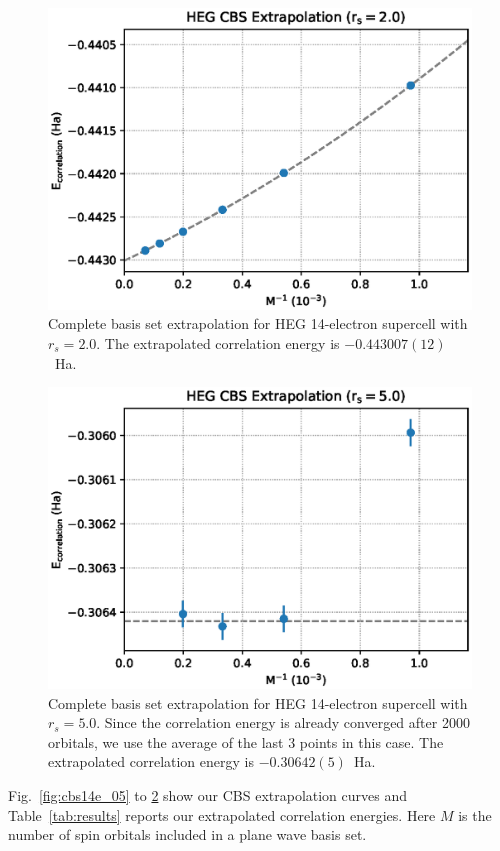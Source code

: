 \documentclass[%
reprint,
 superscriptaddress,
 amsmath,amssymb,
 aps,
]{revtex4-1}
\begin{document}
\begin{figure}
  \begin{center}
  \includegraphics[width=\linewidth]{figs/cbs14e_20.eps}
  \end{center}
  \vspace{-0.2cm}
  \caption{Complete basis set extrapolation for HEG 14-electron supercell with $r_s=2.0$.
  The extrapolated correlation energy is $-0.443007(12)$~Ha.
  }
  \label{fig:cbs14e_20}
\end{figure}
\begin{figure}
  \begin{center}
  \includegraphics[width=\linewidth]{figs/cbs14e_50.eps}
  \end{center}
  \vspace{-0.2cm}
  \caption{Complete basis set extrapolation for HEG 14-electron supercell with $r_s=5.0$.
  Since the correlation energy is already converged after 2000 orbitals, we use the average of the last 3 points in this case.
  The extrapolated correlation energy is $-0.30642(5)$~Ha.
  }
  \label{fig:cbs14e_50}
\end{figure}
Fig.~\ref{fig:cbs14e_05} to \ref{fig:cbs14e_50} show our CBS extrapolation curves and Table~\ref{tab:results} reports our extrapolated correlation energies.
Here $M$ is the number of spin orbitals included in a plane wave basis set.
\end{document}
